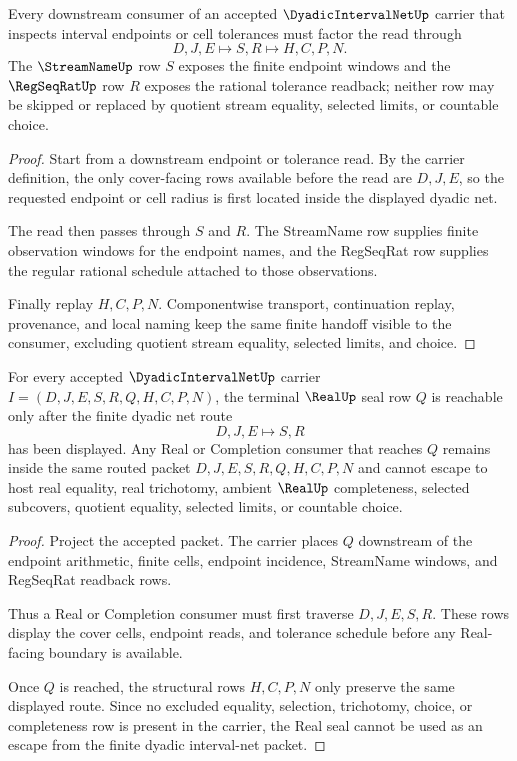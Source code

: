 \begin{theorem}\label{thm:dyadic-interval-net-streamname-regseqrat-handoff}
Every downstream consumer of an accepted $\DyadicIntervalNetUp$ carrier that inspects interval endpoints or cell tolerances must factor the read through
$$
D,J,E \longmapsto S,R \longmapsto H,C,P,N .
$$
The $\StreamNameUp$ row $S$ exposes the finite endpoint windows and the $\RegSeqRatUp$ row $R$ exposes the rational tolerance readback; neither row may be skipped or replaced by quotient stream equality, selected limits, or countable choice.
\end{theorem}
\begin{proof}
Start from a downstream endpoint or tolerance read. By the carrier definition, the only cover-facing rows available before the read are $D,J,E$, so the requested endpoint or cell radius is first located inside the displayed dyadic net.

The read then passes through $S$ and $R$. The StreamName row supplies finite observation windows for the endpoint names, and the RegSeqRat row supplies the regular rational schedule attached to those observations.

Finally replay $H,C,P,N$. Componentwise transport, continuation replay, provenance, and local naming keep the same finite handoff visible to the consumer, excluding quotient stream equality, selected limits, and choice.
\end{proof}

\begin{theorem}\label{thm:dyadic-interval-net-real-seal-nonescape}
For every accepted $\DyadicIntervalNetUp$ carrier $I=(D,J,E,S,R,Q,H,C,P,N)$, the terminal $\RealUp$ seal row $Q$ is reachable only after the finite dyadic net route
$$
D,J,E \longmapsto S,R
$$
has been displayed. Any Real or Completion consumer that reaches $Q$ remains inside the same routed packet $D,J,E,S,R,Q,H,C,P,N$ and cannot escape to host real equality, real trichotomy, ambient $\RealUp$ completeness, selected subcovers, quotient equality, selected limits, or countable choice.
\end{theorem}
\begin{proof}
Project the accepted packet. The carrier places $Q$ downstream of the endpoint arithmetic, finite cells, endpoint incidence, StreamName windows, and RegSeqRat readback rows.

Thus a Real or Completion consumer must first traverse $D,J,E,S,R$. These rows display the cover cells, endpoint reads, and tolerance schedule before any Real-facing boundary is available.

Once $Q$ is reached, the structural rows $H,C,P,N$ only preserve the same displayed route. Since no excluded equality, selection, trichotomy, choice, or completeness row is present in the carrier, the Real seal cannot be used as an escape from the finite dyadic interval-net packet.
\end{proof}

